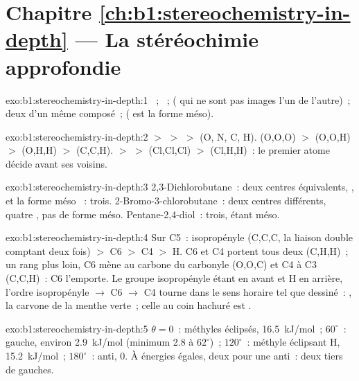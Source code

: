 \section*{Chapitre \ref{ch:b1:stereochemistry-in-depth} --- La stéréochimie approfondie}

\begin{solution}{exo:b1:stereochemistry-in-depth:1}
~; ~; 
( qui ne sont pas images l'un de l'autre)~; deux
 d'un même composé~;  ( est la
forme méso).
\end{solution}

\begin{solution}{exo:b1:stereochemistry-in-depth:2}
 $>$  $>$  $>$  (O, N, C, H).
 (O,O,O) $>$  (O,O,H) $>$  (O,H,H) $>$
 (C,C,H).  $>$  $>$  (Cl,Cl,Cl)
$>$  (Cl,H,H)~: le premier atome décide avant ses voisins.
\end{solution}

\begin{solution}{exo:b1:stereochemistry-in-depth:3}
2,3-Dichlorobutane~: deux centres équivalents, ,  et
la forme méso ~: trois. 2-Bromo-3-chlorobutane~: deux centres
différents, quatre , pas de forme méso.
Pentane-2,4-diol~: trois,  étant méso.
\end{solution}

\begin{solution}{exo:b1:stereochemistry-in-depth:4}
Sur C5~: isopropényle (C,C,C, la liaison double comptant deux fois) $>$
C6 $>$ C4
$>$ H. C6 et C4 portent tous deux (C,H,H)~; un rang plus loin, C6 mène
au carbone du carbonyle (O,O,C) et C4 à C3 (C,C,H)~: C6 l'emporte. Le
groupe isopropényle étant en avant et H en arrière, l'ordre
isopropényle $\to$ C6 $\to$ C4 tourne dans le sens horaire tel que
dessiné~: , la carvone de la menthe verte~; celle au coin hachuré
est .
\end{solution}

\begin{solution}{exo:b1:stereochemistry-in-depth:5}
$\theta = 0$~: méthyles éclipsés, \qty{16.5}{kJ/mol}~; $60^\circ$~:
gauche, environ
\qty{2.9}{kJ/mol} (minimum 2.8 à $62^\circ$)~; $120^\circ$~: méthyle
éclipsant H,
\qty{15.2}{kJ/mol}~; $180^\circ$~: anti, 0. À énergies égales, deux
 pour une anti~: deux tiers de gauches.
\end{solution}

